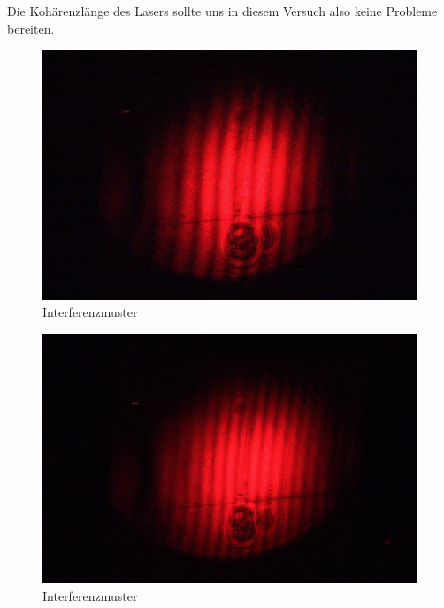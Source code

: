 Die Kohärenzlänge des Lasers sollte uns in diesem Versuch also keine Probleme bereiten. 

 
\begin{figure}[ht]
 \includegraphics[width=\textwidth]{Photos/IMG_3881.jpg}
 \caption{Interferenzmuster}
 \label{michelson_interferenzmuster}
\end{figure}


\begin{figure}[ht]
 \includegraphics[width=\textwidth]{Photos/IMG_3887.jpg}
 \caption{Interferenzmuster}
\end{figure}